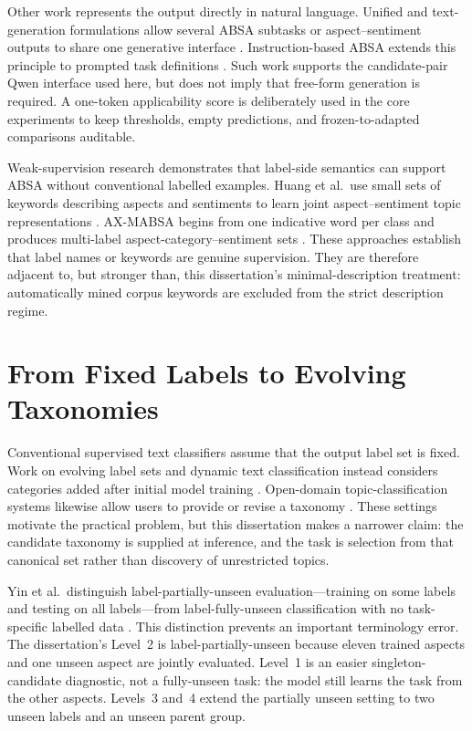 Other work represents the output directly in natural language. Unified and
text-generation formulations allow several ABSA subtasks or
aspect--sentiment outputs to share one generative interface
\cite{yan2021unified}. Instruction-based ABSA extends this principle to
prompted task definitions \cite{scaria2024instructabsa}. Such work supports the
candidate-pair Qwen interface used here, but does not imply that free-form
generation is required. A one-token applicability score is deliberately used
in the core experiments to keep thresholds, empty predictions, and
frozen-to-adapted comparisons auditable.

Weak-supervision research demonstrates that label-side semantics can support
ABSA without conventional labelled examples. Huang et al.\ use small sets of
keywords describing aspects and sentiments to learn joint aspect--sentiment
topic representations \cite{huang2020weakly}. AX-MABSA begins from one
indicative word per class and produces multi-label aspect-category--sentiment
sets \cite{kamila2022ax}. These approaches establish that label names or
keywords are genuine supervision. They are therefore adjacent to, but stronger
than, this dissertation's minimal-description treatment: automatically mined
corpus keywords are excluded from the strict description regime.

\section{From Fixed Labels to Evolving Taxonomies}

Conventional supervised text classifiers assume that the output label set is
fixed. Work on evolving label sets and dynamic text classification instead
considers categories added after initial model training
\cite{godbole2005evolvinglabelsets,wohlwend2019dynamictextclassification}.
Open-domain topic-classification systems likewise allow users to provide or
revise a taxonomy \cite{ding2022opendomain}. These settings motivate the
practical problem, but this dissertation makes a narrower claim: the candidate
taxonomy is supplied at inference, and the task is selection from that
canonical set rather than discovery of unrestricted topics.

Yin et al.\ distinguish label-partially-unseen evaluation---training on some
labels and testing on all labels---from label-fully-unseen classification with
no task-specific labelled data \cite{yin2019benchmarking}. This distinction
prevents an important terminology error. The dissertation's Level~2 is
label-partially-unseen because eleven trained aspects and one unseen aspect are
jointly evaluated. Level~1 is an easier singleton-candidate diagnostic, not a
fully-unseen task: the model still learns the task from the other aspects.
Levels~3 and~4 extend the partially unseen setting to two unseen labels and an
unseen parent group.

